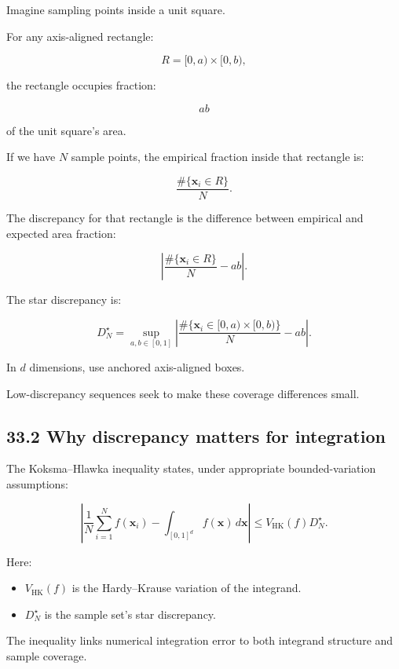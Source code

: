 \hypertarget{02-foundations-ii-ch031-discrepancy-intuition}{}

Imagine sampling points inside a unit square.

For any axis-aligned rectangle:

\[ R=[0,a)\times[0,b), \]

the rectangle occupies fraction:

\[ ab \]

of the unit square's area.

If we have \(N\) sample points, the empirical fraction inside that rectangle is:

\[ \frac{\#\{\mathbf x_i\in R\}}{N}. \]

The discrepancy for that rectangle is the difference between empirical and expected area fraction:

\[ \left| \frac{\#\{\mathbf x_i\in R\}}{N}-ab \right|. \]

The star discrepancy is:

\[ \boxed{ D_N^\star= \sup_{a,b\in[0,1]} \left| \frac{\#\{\mathbf x_i\in[0,a)\times[0,b)\}}N-ab \right| }. \]

In \(d\) dimensions, use anchored axis-aligned boxes.

Low-discrepancy sequences seek to make these coverage differences small.

\subsection{33.2 Why discrepancy matters for integration}\label{02-foundations-ii-ch031-why-discrepancy-matters-for-integration}

\hypertarget{02-foundations-ii-ch031-why-discrepancy-matters-for-integration}{}

The Koksma--Hlawka inequality states, under appropriate bounded-variation assumptions:

\[ \boxed{ \left| \frac1N\sum_{i=1}^{N}f(\mathbf x_i) - \int_{[0,1]^d}f(\mathbf x)\,d\mathbf x \right| \le V_{\mathrm{HK}}(f)D_N^\star }. \]

Here:

\begin{itemize}
\tightlist
\item
  \(V_{\mathrm{HK}}(f)\) is the Hardy--Krause variation of the integrand.
\item
  \(D_N^\star\) is the sample set's star discrepancy.
\end{itemize}

The inequality links numerical integration error to both integrand structure and sample coverage.

